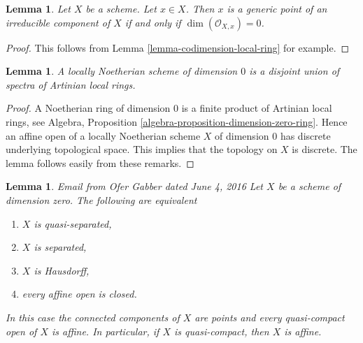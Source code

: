\documentclass{stacks-project}
\newenvironment{reference}{\comment}{\endcomment}
\theoremstyle{plain}
\newtheorem{lemma}[subsection]{Lemma}
\theoremstyle{definition}
\theoremstyle{remark}
\numberwithin{equation}{subsection}
\begin{document}
\begin{lemma}
\label{lemma-generic-point}
Let $X$ be a scheme. Let $x \in X$. Then $x$ is a generic point of
an irreducible component of $X$ if and only if $\dim(\mathcal{O}_{X, x}) = 0$.
\end{lemma}

\begin{proof}
This follows from Lemma \ref{lemma-codimension-local-ring} for example.
\end{proof}

\begin{lemma}
\label{lemma-locally-Noetherian-dimension-0}
A locally Noetherian scheme of dimension $0$ is a disjoint
union of spectra of Artinian local rings.
\end{lemma}

\begin{proof}
A Noetherian ring of dimension $0$ is a finite product of Artinian local
rings, see
Algebra, Proposition \ref{algebra-proposition-dimension-zero-ring}.
Hence an affine open of a locally Noetherian scheme $X$ of dimension
$0$ has discrete underlying topological space. This implies that
the topology on $X$ is discrete. The lemma follows easily from these
remarks.
\end{proof}

\begin{lemma}
\label{lemma-dimension-zero}
\begin{reference}
Email from Ofer Gabber dated June 4, 2016
\end{reference}
Let $X$ be a scheme of dimension zero. The following are equivalent
\begin{enumerate}
\item $X$ is quasi-separated,
\item $X$ is separated,
\item $X$ is Hausdorff,
\item every affine open is closed.
\end{enumerate}
In this case the connected components of $X$ are points and every
quasi-compact open of $X$ is affine. In particular, if $X$
is quasi-compact, then $X$ is affine.
\end{lemma}
\end{document}
